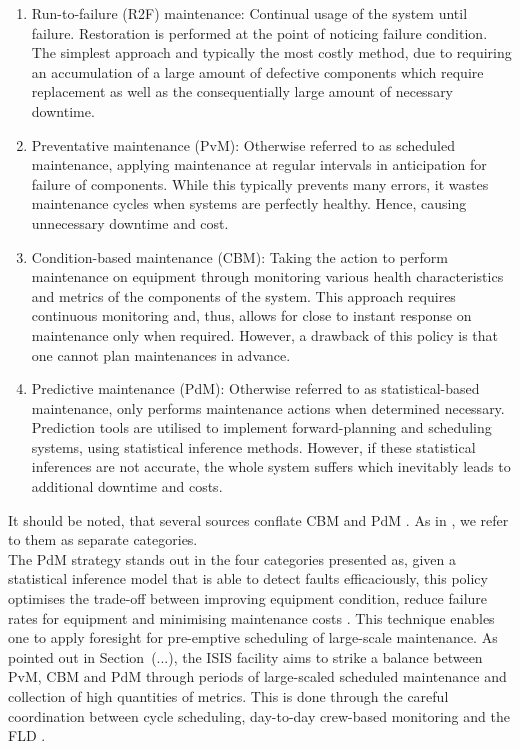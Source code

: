 \documentclass[10pt,oneside]{report}
\begin{document}
\begin{enumerate}
    \item{Run-to-failure (R2F) maintenance: Continual usage of the system until failure. Restoration is performed at the point of noticing failure condition. The simplest approach and typically the most costly method, due to requiring an accumulation of a large amount of defective components which require replacement as well as the consequentially large amount of necessary downtime.}
    \item{Preventative maintenance (PvM): Otherwise referred to as scheduled maintenance, applying maintenance at regular intervals in anticipation for failure of components. While this typically prevents many errors, it wastes maintenance cycles when systems are perfectly healthy. Hence, causing unnecessary downtime and cost.}
    \item{Condition-based maintenance (CBM): Taking the action to perform maintenance on equipment through monitoring various health characteristics and metrics of the components of the system. This approach requires continuous monitoring and, thus, allows for close to instant response on maintenance only when required. However, a drawback of this policy is that one cannot plan maintenances in advance.}
    \item{Predictive maintenance (PdM): Otherwise referred to as statistical-based maintenance, only performs maintenance actions when determined necessary. Prediction tools are utilised to implement forward-planning and scheduling systems, using statistical inference methods. However, if these statistical inferences are not accurate, the whole system suffers which inevitably leads to additional downtime and costs.}
\end{enumerate}
It should be noted, that several sources conflate CBM and PdM \cite{mobley2002introduction}. As in \cite{susto2012predictive}, we refer to them as separate categories. \\ 

The PdM strategy stands out in the four categories presented as, given a statistical inference model that is able to detect faults efficaciously, this policy optimises the trade-off between improving equipment condition, reduce failure rates for equipment and minimising maintenance costs \cite{carvalho2019systematic}. This technique enables one to apply foresight for pre-emptive scheduling of large-scale maintenance.  As pointed out in Section~(...), the ISIS facility aims to strike a balance between PvM, CBM and PdM through periods of large-scaled scheduled maintenance and collection of high quantities of metrics. This is done through the careful coordination between cycle scheduling, day-to-day crew-based monitoring and the FLD \cite{thomason2019isis}.
\end{document}
